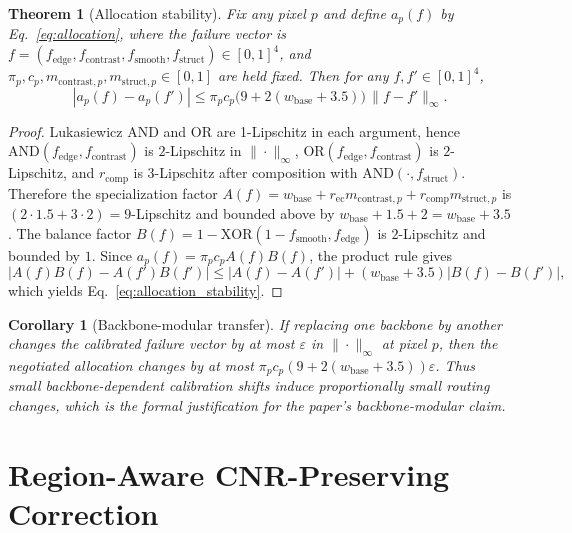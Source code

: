 \documentclass{ieeetj}
\newtheorem{theorem}{Theorem}
\newtheorem{corollary}{Corollary}
\begin{document}
\begin{theorem}[Allocation stability]
\label{thm:allocation_stability}
Fix any pixel $p$ and define $a_p(f)$ by Eq.~\eqref{eq:allocation}, where the failure vector is $f=(f_\text{edge},f_\text{contrast},f_\text{smooth},f_\text{struct})\in[0,1]^4$, and $\pi_p,c_p,m_{\text{contrast},p},m_{\text{struct},p}\in[0,1]$ are held fixed. Then for any $f,f'\in[0,1]^4$,
\begin{equation}
|a_p(f)-a_p(f')| \le \pi_p c_p \bigl(9 + 2(w_\text{base}+3.5)\bigr)\,\|f-f'\|_\infty.
\label{eq:allocation_stability}
\end{equation}
\end{theorem}
\begin{proof}
Lukasiewicz AND and OR are 1-Lipschitz in each argument, hence $\text{AND}(f_\text{edge},f_\text{contrast})$ is $2$-Lipschitz in $\|\cdot\|_\infty$, $\text{OR}(f_\text{edge},f_\text{contrast})$ is $2$-Lipschitz, and $r_\text{comp}$ is $3$-Lipschitz after composition with $\text{AND}(\cdot,f_\text{struct})$. Therefore the specialization factor $A(f)=w_\text{base}+r_\text{ec}m_{\text{contrast},p}+r_\text{comp}m_{\text{struct},p}$ is $(2\cdot1.5+3\cdot2)=9$-Lipschitz and bounded above by $w_\text{base}+1.5+2=w_\text{base}+3.5$. The balance factor $B(f)=1-\text{XOR}(1-f_\text{smooth},f_\text{edge})$ is $2$-Lipschitz and bounded by $1$. Since $a_p(f)=\pi_p c_p A(f)B(f)$, the product rule gives
\[
|A(f)B(f)-A(f')B(f')| \le |A(f)-A(f')| + (w_\text{base}+3.5)|B(f)-B(f')|,
\]
which yields Eq.~\eqref{eq:allocation_stability}.
\end{proof}

\begin{corollary}[Backbone-modular transfer]
If replacing one backbone by another changes the calibrated failure vector by at most $\varepsilon$ in $\|\cdot\|_\infty$ at pixel $p$, then the negotiated allocation changes by at most $\pi_p c_p (9+2(w_\text{base}+3.5))\varepsilon$. Thus small backbone-dependent calibration shifts induce proportionally small routing changes, which is the formal justification for the paper's backbone-\emph{modular} claim.
\end{corollary}

\section{Region-Aware CNR-Preserving Correction}
\label{sec:cnr}
\end{document}
